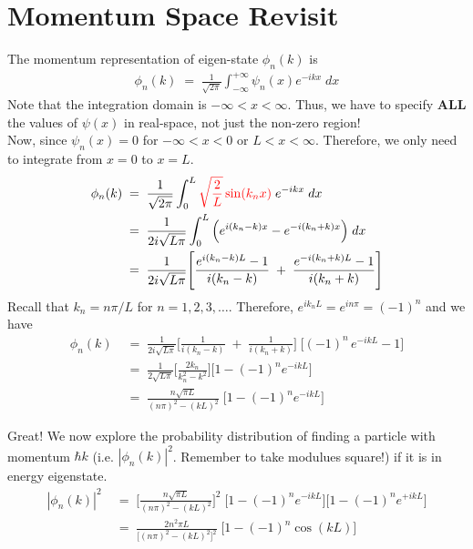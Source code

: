 \documentclass[12pt,a4paper]{article}
\begin{document}
\clearpage

\section{Momentum Space Revisit}

The momentum representation of eigen-state $\phi_{n}(k)$ is 
\begin{align}
	\phi_{n}(k) \; = \; \frac{1}{\sqrt{2 \pi}} \int_{-\infty}^{+\infty} \psi_{n}(x) e^{-ikx} \; dx
\end{align}
Note that the integration domain is $-\infty < x < \infty$. Thus, we have to specify \textbf{ALL} the values of $\psi(x)$ in real-space, not just the non-zero region!\\

Now, since $\psi_{n}(x) = 0$ for $-\infty < x < 0$ or $L < x < \infty$. Therefore, we only need to integrate from $x=0$ to $x=L$.
\begin{align}
	\phi_{n}(k) \; &= \; 
	\frac{1}{\sqrt{2 \pi}} \int_{0}^{L} \color{red} \sqrt{\frac{2}{L}} \sin (k_{n} x) \; \color{black}  e^{-ikx} \; dx \\
	\; &= \; 
	\frac{1}{2i \sqrt{L \pi}} \int_{0}^{L} \Big( e^{i (k_{n}-k)x} - e^{-i(k_{n}+k)x} \Big)\; dx \\
	\; &= \;
	\frac{1}{2i \sqrt{L \pi}} \Bigg[
	\frac{e^{i(k_{n}-k)L}-1}{i(k_{n}-k)}
	 \; + \;
	\frac{e^{-i(k_{n}+k)L}-1}{i(k_{n} + k)}
	\Bigg]
\end{align}
Recall that $k_{n} = n \pi / L$ for $n = 1, 2, 3, \dots$. Therefore, $e^{ik_{n}L} = e^{in\pi} = (-1)^{n}$ and we have
\begin{align}
	\phi_{n}(k) \; &= \; 
	\frac{1}{2i \sqrt{L \pi}} \Bigg[
	\frac{1}{i(k_{n}-k)}
	\; + \;
	\frac{1}{i(k_{n} + k)}
	\Bigg] \; \Bigg[ (-1)^{n} \, e^{-ikL}-1 \Bigg] \\
	\; &= \;
	\frac{1}{2\sqrt{L \pi}}
	\Bigg[ \frac{2k_{n}}{k_{n}^{2} - k^{2}} \Bigg] \Bigg[1 - (-1)^{n} e^{-ikL} \Bigg] \\
	\; &= \;
	\frac{n \sqrt{\pi L}}{ (n\pi)^{2} - (kL)^{2}} \; \Bigg[1 - (-1)^{n} e^{-ikL} \Bigg]
\end{align}

Great! We now explore the probability distribution of finding a particle with momentum $\hbar k$ (i.e. $|\phi_{n}(k)|^{2}$. Remember to take modulues square!) if it is in energy eigenstate.
\begin{align}
	|\phi_{n}(k)|^{2} \; &= \; 
	\Bigg[ \frac{n \sqrt{\pi L}}{ (n\pi)^{2} - (kL)^{2}} \Bigg]^{2} \; 
	\Bigg[1 - (-1)^{n} e^{-ikL} \Bigg] \Bigg[1 - (-1)^{n} e^{+ikL} \Bigg]\\
	\; &= \;
	\frac{2n^{2} \pi L}{ \big[ (n\pi)^{2} - (kL)^{2} \big]^{2}} \;
	\Big[1 - (-1)^{n} \cos(kL) \Big] \label{eqn:kspace}
\end{align}
\end{document}
